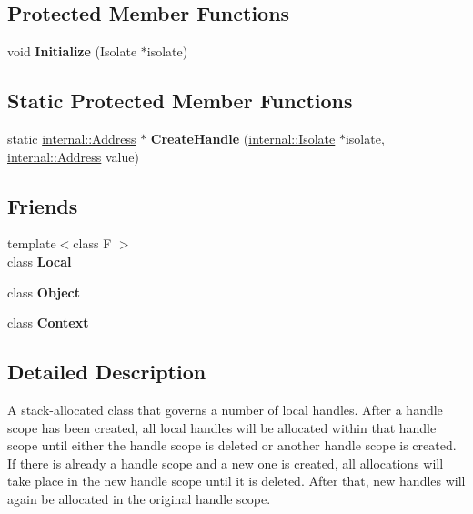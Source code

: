 \subsection*{Protected Member Functions}
\begin{DoxyCompactItemize}
\item 
\mbox{\label{classv8_1_1HandleScope_a7bb8631c1c8756b05e9232b8414dd992}} 
void {\bfseries Initialize} (Isolate $\ast$isolate)
\end{DoxyCompactItemize}
\subsection*{Static Protected Member Functions}
\begin{DoxyCompactItemize}
\item 
\mbox{\label{classv8_1_1HandleScope_a21380ab50614c23122d2041525b2baa8}} 
static \mbox{\hyperlink{classuintptr__t}{internal\+::\+Address}} $\ast$ {\bfseries Create\+Handle} (\mbox{\hyperlink{classv8_1_1internal_1_1Isolate}{internal\+::\+Isolate}} $\ast$isolate, \mbox{\hyperlink{classuintptr__t}{internal\+::\+Address}} value)
\end{DoxyCompactItemize}
\subsection*{Friends}
\begin{DoxyCompactItemize}
\item 
\mbox{\label{classv8_1_1HandleScope_afb872edb4aac7ba55f0da004113aa2b0}} 
{\footnotesize template$<$class F $>$ }\\class {\bfseries Local}
\item 
\mbox{\label{classv8_1_1HandleScope_a0720b5f434e636e22a3ed34f847eec57}} 
class {\bfseries Object}
\item 
\mbox{\label{classv8_1_1HandleScope_ac26c806e60ca4a0547680edb68f6e39b}} 
class {\bfseries Context}
\end{DoxyCompactItemize}


\subsection{Detailed Description}
A stack-\/allocated class that governs a number of local handles. After a handle scope has been created, all local handles will be allocated within that handle scope until either the handle scope is deleted or another handle scope is created. If there is already a handle scope and a new one is created, all allocations will take place in the new handle scope until it is deleted. After that, new handles will again be allocated in the original handle scope.

